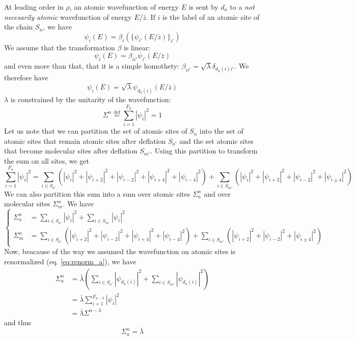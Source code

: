 \documentclass[11pt]{article}
\newcommand{\define}{\ensuremath{ \overset{\text{def}}{=} }}
\begin{document}
At leading order in $\rho$, an atomic wavefunction of energy $E$ is sent by $d_a$ to a \emph{not necesarily atomic} wavefunction of energy $E/\bar z$.
If $i$ is the label of an atomic site of the chain $S_n$, we have
\begin{equation}
	\psi_i(E)  = \beta_i\left(\{ \psi_{i'}(E/\bar z) \}_{i'}\right)
\end{equation} 
We assume that the transformation $\beta$ is linear:
\begin{equation}
	\psi_i(E)  = \beta_{ii'}  \psi_{i'}(E/\bar z)
\end{equation}
and even more than that, that it is a simple homothety: $\beta_{ii'} = \sqrt{\lambda} \delta_{d_a(i)i'}$.
We therefore have
\begin{equation}
\label{eq:renorm_a}
	\psi_i(E) = \sqrt{\lambda} \psi_{d_a(i)}(E/\bar z)
\end{equation}
$\lambda$ is constrained by the unitarity of the wavefunction:
\begin{equation}
	\Sigma^n \define \sum_{i=1}^{F_n} |\psi_i|^2 = 1
\end{equation}
Let us note that we can partition the set of atomic sites of $S_n$ into the set of atomic sites that remain atomic sites after deflation $S_{a'}$ and the set atomic sites that become molecular sites after deflation $S_{m'}$.
Using this partition to transform the sum on all sites, we get
\begin{equation}
	\sum_{i=1}^{F_n} |\psi_i|^2 = \sum_{i \in S_{a'}} \left( |\psi_i|^2 + |\psi_{i+2}|^2 + |\psi_{i-2}|^2 + |\psi_{i+4}|^2 + |\psi_{i-4}|^2 \right) + \sum_{i \in S_{m'}} \left( |\psi_i|^2 + |\psi_{i+2}|^2 + |\psi_{i-2}|^2 + |\psi_{i\pm4}|^2 \right)
\end{equation}
We can also partition this sum into a sum over atomic sites $\Sigma^n_a$ and over molecular sites $\Sigma^n_m$.
We have
\begin{equation}
	\begin{cases}
	\Sigma^n_a &= \sum_{i \in S_{a'}}  |\psi_i|^2  + \sum_{i \in S_{m'}}  |\psi_i|^2\\
	\Sigma^n_m &= \sum_{i \in S_{a'}} \left( |\psi_{i+2}|^2 + |\psi_{i-2}|^2 + |\psi_{i+4}|^2 + |\psi_{i-4}|^2 \right) + \sum_{i \in S_{m'}} \left(|\psi_{i+2}|^2 + |\psi_{i-2}|^2 + |\psi_{i\pm4}|^2 \right)
	\end{cases}
\end{equation}
Now, beacause of the way we assumed the wavefunction on atomic sites is renormalized (eq. \eqref{eq:renorm_a}), we have
\begin{align}
	\Sigma_a^n &= \bar \lambda  \left(  \sum_{i \in S_{a'}}  |\psi_{d_a(i)}|^2  + \sum_{i \in S_{m'}}  |\psi_{d_a(i)}|^2 \right) \\
	&= \bar \lambda \sum_{i = 1}^{F_{n-3}} |\psi_i|^2 \\
	&= \bar \lambda \Sigma^{n-3}
\end{align}
and thus
\begin{equation}
\label{eq:renorm_aa}
\boxed{
	\Sigma_a^n = \bar \lambda
	}
\end{equation}
\end{document}
